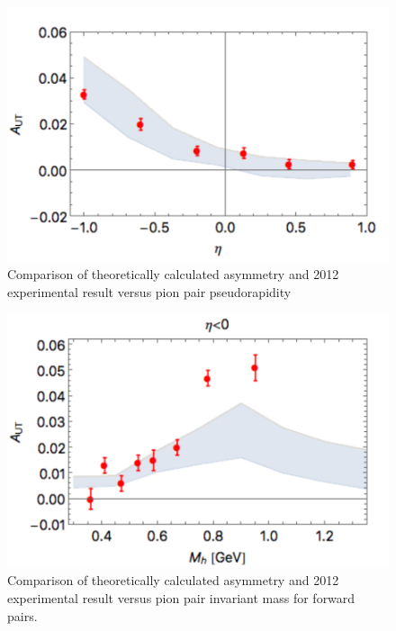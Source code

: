 \documentclass[letterpaper, abstract = on,listof=totoc, bibliography=totoc]{scrreprt}
\begin{document}


\begin{figure}
\begin{center}
\includegraphics[width = .6\textwidth]{A_eta}
\caption[Comparison of theoretically calculated asymmetry and 2012 experimental result versus pion pair pseudorapidity]{Comparison of theoretically calculated asymmetry and 2012 experimental result versus pion pair pseudorapidity}
\label{fig:A_eta_calc}
\end{center}
\end{figure}

\begin{figure}
\begin{center}
\includegraphics[width = .6\textwidth]{A_Mh_eta-neg}
\caption[Comparison of theoretically calculated asymmetry and 2012 experimental result versus pion pair invariant mass for forward pairs]{Comparison of theoretically calculated asymmetry and 2012 experimental result versus pion pair invariant mass for forward pairs.}
\label{fig:A_Mh_eta-neg_calc}
\end{center}
\end{figure}
\end{document}
